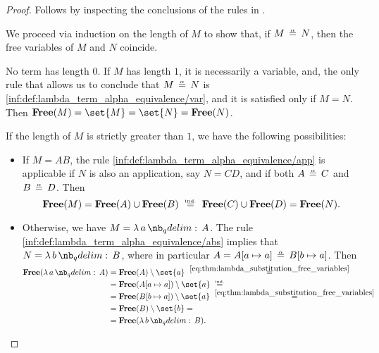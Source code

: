 \begin{proof}
   Follows by inspecting the conclusions of the rules in .

   We proceed via induction on the length of \( M \) to show that, if \( M \aequiv N \), then the free variables of \( M \) and \( N \) coincide.

  No term has length \( 0 \). If \( M \) has length \( 1 \), it is necessarily a variable, and, the only rule that allows us to conclude that \( M \aequiv N \) is \ref{inf:def:lambda_term_alpha_equivalence/var}, and it is satisfied only if \( M = N \). Then \( \op*{Free}(M) = \set{ M } = \set{ N } = \op*{Free}(N) \).

  If the length of \( M \) is strictly greater than \( 1 \), we have the following possibilities:
  \begin{itemize}
    \item If \( M = AB \), the rule \ref{inf:def:lambda_term_alpha_equivalence/app} is applicable if \( N \) is also an application, say \( N = CD \), and if both \( A \aequiv C \) and \( B \aequiv D \). Then
    \begin{equation*}
      \op*{Free}(M)
      =
      \op*{Free}(A) \cup \op*{Free}(B)
      \reloset{\T{ind.}} =
      \op*{Free}(C) \cup \op*{Free}(D)
      =
      \op*{Free}(N).
    \end{equation*}

    \item Otherwise, we have \( M = \qabs a A \). The rule \ref{inf:def:lambda_term_alpha_equivalence/abs} implies that \( N = \qabs b B \), where in particular \( A = A[a \mapsto a] \aequiv B[b \mapsto a] \). Then
    \begin{align*}
      \op*{Free}(\qabs a A)
      &=
      \op*{Free}(A) \setminus \set{ a }
      \reloset {\eqref{eq:thm:lambda_substitution_free_variables}} = \\ &=
      \op*{Free}(A[a \mapsto a]) \setminus \set{ a }
      \reloset{\T{ind.}} = \\ &=
      \op*{Free}(B[b \mapsto a]) \setminus \set{ a }
      \reloset {\eqref{eq:thm:lambda_substitution_free_variables}} = \\ &=
      \op*{Free}(B) \setminus \set{ b }
      = \\ &=
      \op*{Free}(\qabs b B).
    \end{align*}
  \end{itemize}


\end{proof}
